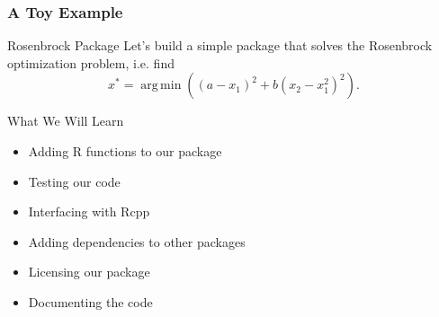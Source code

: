 \documentclass[aspectratio=1610,onlytextwidth]{beamer}
\begin{document}
\begin{frame}[c]
  \frametitle{A Toy Example}

  \begin{block}{Rosenbrock Package}
    Let's build a simple package that solves the Rosenbrock optimization problem, i.e.
    find
    \[
      x^* = \operatorname{arg\,min}\left((a - x_1)^2 + b(x_2 - x_1^2)^2\right).
    \]
  \end{block}

  \bigskip\pause

  \begin{block}{What We Will Learn}
    \begin{itemize}[<+->]
      \item Adding R functions to our package
      \item Testing our code
      \item Interfacing with Rcpp
      \item Adding dependencies to other packages
      \item Licensing our package
      \item Documenting the code
    \end{itemize}
  \end{block}
\end{frame}
\end{document}
